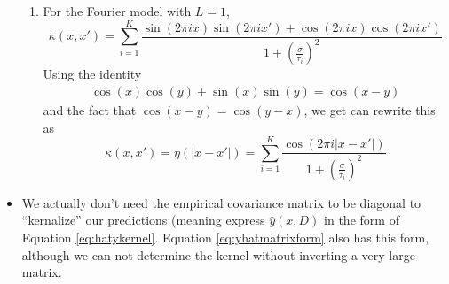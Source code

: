 \begin{itemize}
\begin{example}
\begin{enumerate}[label=(\alph*)]
\item For the Fourier model  with $L=1$, 
\begin{equation*}
\kappa(x,x') = \sum_{i=1}^K\frac{\sin(2\pi i x)\sin(2\pi i x')+ \cos(2\pi i x)\cos(2\pi i x')}{1 + \left(\frac{\sigma}{\tau_i} \right)^2}
\end{equation*}
Using the identity 
\begin{align*}
\cos(x)\cos(y) + \sin(x)\sin(y) = \cos(x-y)
\end{align*}
and the fact that $\cos(x-y) = \cos(y-x)$, we get can rewrite this as
\begin{equation*}
\kappa(x,x') = \eta(|x-x'|) =  \sum_{i=1}^K\frac{\cos(2\pi i |x-x'|)}{1 + \left(\frac{\sigma}{\tau_i} \right)^2}
\end{equation*}
\end{enumerate}
\end{example}

\item We actually don't need the empirical covariance matrix to be diagonal to ``kernalize'' our predictions (meaning express $\hat{y}(x,D)$ in the form of Equation \ref{eq:hatykernel}. Equation \ref{eq:yhatmatrixform} also has this form, although we can not determine the kernel without inverting a very large matrix. 

\end{itemize}














